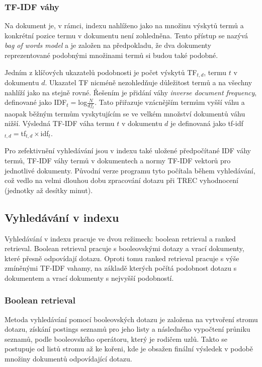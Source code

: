 \documentclass[11pt,a4paper]{scrartcl}
\begin{document}
	\subsubsection{TF-IDF váhy}
	Na dokument je, v rámci, indexu nahlíženo jako na množinu výskytů termů a konkrétní pozice termu v dokumentu není zohledněna. Tento přístup se nazývá \textit{bag of words model} a je založen na předpokladu, že dva dokumenty reprezentované podobnými množinami termů si budou také podobné.
	
	Jedním z klíčových ukazatelů podobnosti je počet výskytů TF$_{t,d}$, termu $t$ v dokumentu $d$. Ukazatel TF nicméně nezohledňuje důležitost termů a na všechny nahlíží jako na stejně rovné. Řešením je přidání váhy \textit{inverse document frequency}, definované jako IDF$_t=$log$\frac{N}{df_t}$. Tato přiřazuje vzácnějším termům vyšší váhu a naopak běžným termům vyskytujícím se ve velkém množství dokumentů váhu nižší. Výsledná TF-IDF váha termu $t$ v dokumentu $d$ je definovaná jako tf-idf$_{t,d}=$tf$_{t,d}\times$idf$_t$.  
	
	Pro zefektivnění vyhledávání jsou v indexu také uložené předpočítané IDF váhy termů, TF-IDF váhy termů v dokumentech a normy TF-IDF vektorů pro jednotlivé dokumenty. Původní verze programu tyto počítala během vyhledávání, což vedlo na velmi dlouhou dobu zpracování dotazu při TREC vyhodnocení (jednotky až desítky minut).
	
	\subsection{Vyhledávání v indexu}
	
	Vyhledávání v indexu pracuje ve dvou režimech: boolean retrieval a ranked retrieval. Boolean retrieval pracuje s booleovskými dotazy a vrací dokumenty, které přesně odpovídají dotazu. Oproti tomu ranked retrieval pracuje s výše zmíněnými TF-IDF vahamy, na základě kterých počítá podobnost dotazu s dokumentem a vrací dokumenty s nejvyšší podobností.
	
	\subsubsection{Boolean retrieval}

	Metoda vyhledávání pomocí booleovských dotazu je založena na vytvoření stromu dotazu, získání postings seznamů pro jeho listy a následného vypočtení průniku seznamů, podle booleovského operátoru, který je rodičem uzlů. Takto se postupuje od listů stromu až ke kořeni, kde je obsažen finální výsledek v podobě množiny dokumentů odpovídající dotazu.
	
\end{document}
